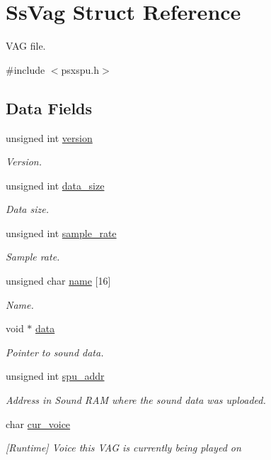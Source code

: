 \hypertarget{structSsVag}{}\section{Ss\+Vag Struct Reference}
\label{structSsVag}


V\+AG file.  




{\ttfamily \#include $<$psxspu.\+h$>$}

\subsection*{Data Fields}
\begin{DoxyCompactItemize}
\item 
unsigned int \hyperlink{structSsVag_ad9ab18aa60cbf2641b770dfc0a51d2dc}{version}
\begin{DoxyCompactList}\small\item\em Version. \end{DoxyCompactList}\item 
unsigned int \hyperlink{structSsVag_a5a90d2091bd45c5c0bae18ae1bbeed28}{data\+\_\+size}
\begin{DoxyCompactList}\small\item\em Data size. \end{DoxyCompactList}\item 
unsigned int \hyperlink{structSsVag_adf52d04265b92a1aa68b63ed235cfdfa}{sample\+\_\+rate}
\begin{DoxyCompactList}\small\item\em Sample rate. \end{DoxyCompactList}\item 
unsigned char \hyperlink{structSsVag_aca71e6a5db585ab73a03d8f0743894e9}{name} \mbox{[}16\mbox{]}
\begin{DoxyCompactList}\small\item\em Name. \end{DoxyCompactList}\item 
void $\ast$ \hyperlink{structSsVag_a32e792329ffd00dac0bb87919ac19a75}{data}
\begin{DoxyCompactList}\small\item\em Pointer to sound data. \end{DoxyCompactList}\item 
unsigned int \hyperlink{structSsVag_a69eb2b0fb6383829e4e148dd1be8bdde}{spu\+\_\+addr}
\begin{DoxyCompactList}\small\item\em Address in Sound R\+AM where the sound data was uploaded. \end{DoxyCompactList}\item 
char \hyperlink{structSsVag_aab6f6eeadc95cb69ccb533e7eb3bfffa}{cur\+\_\+voice}
\begin{DoxyCompactList}\small\item\em \mbox{[}Runtime\mbox{]} Voice this V\+AG is currently being played on \end{DoxyCompactList}\end{DoxyCompactItemize}


